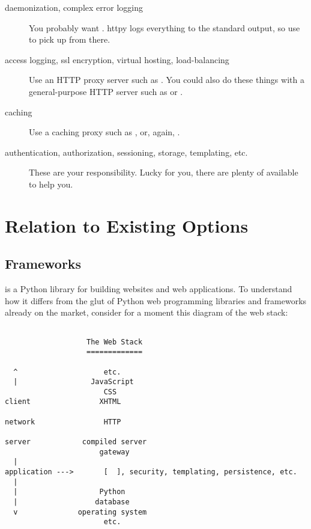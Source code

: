 \begin{description}

\item[daemonization, complex error logging]
    {You probably want . httpy logs everything to the
    standard output, so use
     to pick up from
    there.}

\item[access logging, ssl encryption, virtual hosting, load-balancing]
    {Use an HTTP proxy server such as .
    You could also do these things with a general-purpose HTTP server such as
     or
    .}

\item[caching]
    {Use a caching proxy such as , or,
    again, .}

\item[authentication, authorization, sessioning, storage, templating, etc.]
    {These are your responsibility. Lucky for you, there are plenty of
     available to help
    you.}

\end{description}



\section{Relation to Existing Options}

\subsection{Frameworks \label{frameworks}}

 is a Python library for building websites and web applications.
To understand how it differs from the glut of Python web programming libraries
and frameworks already on the market, consider for a moment this diagram of the
web stack:

\begin{verbatim}

                   The Web Stack
                   =============

  ^                    etc.
  |                 JavaScript
                       CSS
client                XHTML

network                HTTP

server            compiled server
                      gateway
  |
application --->       [  ], security, templating, persistence, etc.
  |
  |                   Python
  |                  database
  v              operating system
                       etc.

\end{verbatim}

